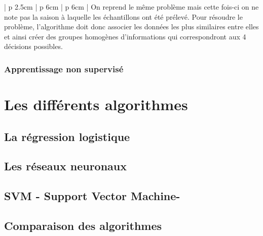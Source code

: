 \begin{table}[h]
\begin{tabular}{ | p {2.5cm} | p {6cm} | p {6cm} |}
	On reprend le même problème mais cette fois-ci on ne note pas la saison à laquelle les échantillons ont été prélevé. Pour résoudre le problème, l'algorithme doit donc associer les données les plus similaires entre elles et ainsi créer des groupes homogènes d'informations qui correspondront aux 4 décisions possibles. \\
	\hline
	\end{tabular}
	\caption[Comparaison des différents modèles d'apprentissage]{Comparaison de l'apprentissage supervisé et non supervisé par des exemples}
	\label {tab: Comparaison des différentes méthodes d'apprentissage}
\end{table}


\subsubsection{Apprentissage non supervisé} 
\label{Le Machine Learning: Généralités sur le Machine Learning: Le modèle: Apprentissage non supervisé}

\section{Les différents algorithmes}
\label{ILe Machine Learning: Les différents algorithmes}

\subsection{La régression logistique}
\label{ILe Machine Learning: Les différents algorithmes: La regression logistique}

\subsection{Les réseaux neuronaux}
\label{ILe Machine Learning: Les différents algorithmes: Les réseaux neuronaux}

\subsection{SVM - Support Vector Machine-}
\label{ILe Machine Learning: Les différents algorithmes: SVM}

\subsection{Comparaison des algorithmes}
\label{ILe Machine Learning: Les différents algorithmes: Comparaison des algorithmes}